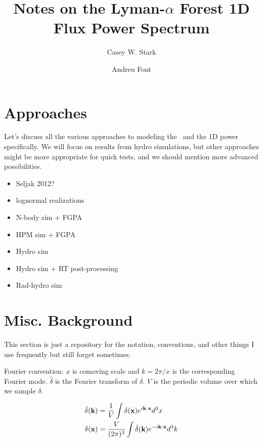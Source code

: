 \documentclass[twocolumn]{article}
\begin{document}
\title{
    Notes on the Lyman-$\alpha$ Forest 1D Flux Power Spectrum
}

\author[1]{Casey W. Stark}
\author[2]{Andreu Font}

\maketitle

\section{Approaches}

Let's discuss all the various approaches to modeling the \Lyaf\ and the 1D power
specifically. We will focus on results from hydro simulations, but other
approaches might be more appropriate for quick tests, and we should mention more
advanced possibilities.

\begin{itemize}
  \item Seljak 2012?
  \item lognormal realizations
  \item N-body sim + FGPA
  \item HPM sim + FGPA
  \item Hydro sim
  \item Hydro sim + RT post-processing
  \item Rad-hydro sim
\end{itemize}

\section{Misc. Background}

This section is just a repository for the notation, conventions, and other
things I use frequently but still forget sometimes.

Fourier convention: $x$ is comoving scale and $k = 2 \pi / x$ is the
corresponding Fourier mode. $\hat{\delta}$ is the Fourier transform of $\delta$.
$V$ is the periodic volume over which we sample $\delta$.

\begin{equation}
  \begin{aligned}
    & \hat \delta(\mathbf{k}) = \frac{1}{V} \int \delta(\mathbf{x}) e^{i \mathbf{k} \cdot \mathbf{x}} d^3x \\
    & \delta(\mathbf{x}) = \frac{V}{(2 \pi)^3} \int \hat \delta(\mathbf{k}) e^{-i \mathbf{k} \cdot \mathbf{x}} d^3k
  \end{aligned}
\end{equation}
\end{document}
